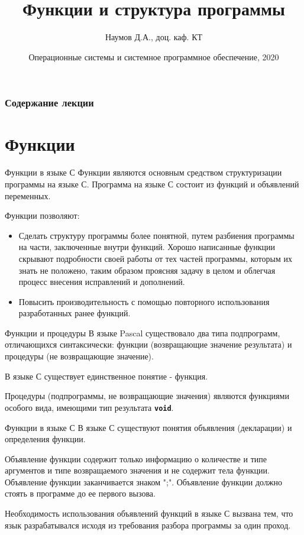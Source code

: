 \documentclass{beamer}
\title[Язык C]{Функции и структура программы}
\author{Наумов Д.А., доц. каф. КТ}
\date[10.09.2020] {Операционные системы и системное программное обеспечение, 2020}
\begin{document}
\begin{frame}
  \titlepage
\end{frame}
  
\begin{frame}
  \frametitle{Содержание лекции}
  \tableofcontents  
\end{frame}

\section{Функции}

\begin{frame}{Функции в языке С}
    Функции являются основным средством структуризации программы на языке С. Программа на языке С состоит из функций и объявлений переменных.
    
    \medskip
    Функции позволяют:
    \begin{itemize}
        \item Сделать структуру программы более понятной, путем разбиения программы на части, заключенные внутри функций. Хорошо написанные функции скрывают подробности своей работы от тех частей программы, которым их знать не положено, таким образом проясняя задачу в целом и облегчая процесс внесения исправлений и дополнений.
        \item Повысить производительность с помощью повторного использования разработанных ранее функций.
    \end{itemize}
\end{frame}

\begin{frame}{Функции и процедуры}
    В языке Pascal существовало два типа подпрограмм, отличающихся синтаксически: функции (возвращающие значение результата) и процедуры (не возвращающие значение).
    
    \medskip
    В языке С существует единственное понятие - функция.
    
    \medskip
    Процедуры (подпрограммы, не возвращающие значения) являются функциями особого вида, имеющими тип результата \textbf{\texttt{void}}.
\end{frame}


\begin{frame}{Функции в языке С}
    В языке С существуют понятия объявления (декларации) и определения функции.
    
    \medskip
    Объявление функции содержит только информацию о количестве и типе аргументов и типе возвращаемого значения и не содержит тела функции. Объявление функции заканчивается знаком ";". Объявление функции должно стоять в программе до ее первого вызова. 
    
    \medskip
    Необходимость использования объявлений функций в языке С вызвана тем, что язык разрабатывался исходя из требования разбора программы за один проход.
\end{frame}
\end{document}

